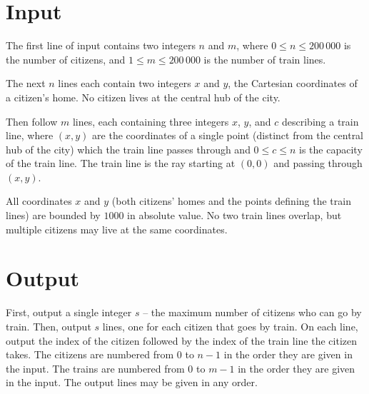 \section*{Input}

The first line of input contains two integers $n$ and $m$, where
$0 \le n \le 200\,000$ is the number of citizens, and $1 \le m \le
200\,000$ is the number of train lines.

The next $n$ lines each contain two integers $x$ and $y$, the
Cartesian coordinates of a citizen's home.  No citizen lives at the
central hub of the city.

Then follow $m$ lines, each containing three integers $x$, $y$, and $c$ describing a train line, where $(x, y)$ are the
coordinates of a single point (distinct from the central hub of the
city) which the train line passes through and $0 \le c \le n$ is the
capacity of the train line.  The train line is the ray
starting at $(0, 0)$ and passing through $(x, y)$.

All coordinates $x$ and $y$ (both citizens' homes and the points defining the train lines) are bounded by $1000$ in absolute value.
No two train lines overlap, but multiple citizens may live at the same coordinates.

\section*{Output}

First, output a single integer $s$ -- the maximum number of citizens who can go by train.
Then, output $s$ lines, one for each citizen that goes by train.
On each line, output the index of the citizen followed by the index of the train line the citizen takes.
The citizens are numbered from $0$ to $n-1$ in the order they are given in the input.  The trains are numbered from $0$ to $m-1$ in the order they are given in the input.   The output lines may be given in any order.
